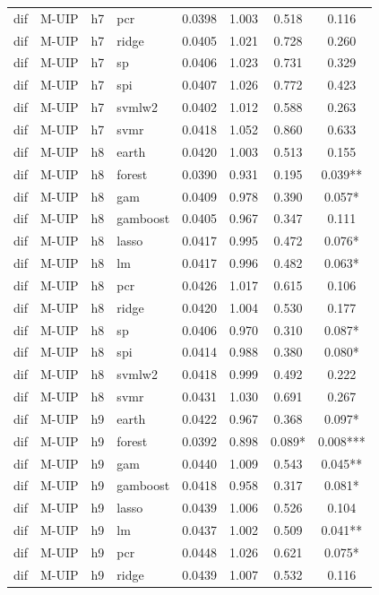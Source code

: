 \begin{ThreePartTable}
\begin{longtable}[t]{llclcccc}
dif & M-UIP & h7 & pcr & 0.0398 & 1.003 & 0.518 & 0.116\\
dif & M-UIP & h7 & ridge & 0.0405 & 1.021 & 0.728 & 0.260\\
dif & M-UIP & h7 & sp & 0.0406 & 1.023 & 0.731 & 0.329\\
dif & M-UIP & h7 & spi & 0.0407 & 1.026 & 0.772 & 0.423\\
dif & M-UIP & h7 & svmlw2 & 0.0402 & 1.012 & 0.588 & 0.263\\
dif & M-UIP & h7 & svmr & 0.0418 & 1.052 & 0.860 & 0.633\\
\addlinespace
dif & M-UIP & h8 & earth & 0.0420 & 1.003 & 0.513 & 0.155\\
dif & M-UIP & h8 & forest & 0.0390 & 0.931 & 0.195 & 0.039**\\
dif & M-UIP & h8 & gam & 0.0409 & 0.978 & 0.390 & 0.057*\\
dif & M-UIP & h8 & gamboost & 0.0405 & 0.967 & 0.347 & 0.111\\
dif & M-UIP & h8 & lasso & 0.0417 & 0.995 & 0.472 & 0.076*\\
dif & M-UIP & h8 & lm & 0.0417 & 0.996 & 0.482 & 0.063*\\
dif & M-UIP & h8 & pcr & 0.0426 & 1.017 & 0.615 & 0.106\\
dif & M-UIP & h8 & ridge & 0.0420 & 1.004 & 0.530 & 0.177\\
dif & M-UIP & h8 & sp & 0.0406 & 0.970 & 0.310 & 0.087*\\
dif & M-UIP & h8 & spi & 0.0414 & 0.988 & 0.380 & 0.080*\\
dif & M-UIP & h8 & svmlw2 & 0.0418 & 0.999 & 0.492 & 0.222\\
dif & M-UIP & h8 & svmr & 0.0431 & 1.030 & 0.691 & 0.267\\
\addlinespace
dif & M-UIP & h9 & earth & 0.0422 & 0.967 & 0.368 & 0.097*\\
dif & M-UIP & h9 & forest & 0.0392 & 0.898 & 0.089* & 0.008***\\
dif & M-UIP & h9 & gam & 0.0440 & 1.009 & 0.543 & 0.045**\\
dif & M-UIP & h9 & gamboost & 0.0418 & 0.958 & 0.317 & 0.081*\\
dif & M-UIP & h9 & lasso & 0.0439 & 1.006 & 0.526 & 0.104\\
dif & M-UIP & h9 & lm & 0.0437 & 1.002 & 0.509 & 0.041**\\
dif & M-UIP & h9 & pcr & 0.0448 & 1.026 & 0.621 & 0.075*\\
dif & M-UIP & h9 & ridge & 0.0439 & 1.007 & 0.532 & 0.116\\

\end{longtable}
\end{ThreePartTable}
